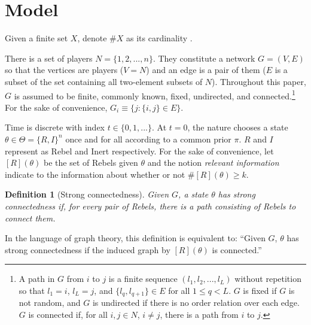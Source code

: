 \documentclass[12pt,letter]{article}
\newtheorem{definition}{Definition}[section]
\theoremstyle{definition}
\theoremstyle{remark}
\theoremstyle{claim}
\begin{document}
\section{Model}
\label{sec:model}
Given a finite set $X$, denote $\#X$ as its cardinality . 


There is a set of players $N=\{1,2,...,n\}$. They constitute a network $G=(V,E)$ so that the vertices are players ($V=N$) and an edge is a pair of them ($E$ is a subset of the set containing all two-element subsets of $N$). Throughout this paper, $G$ is assumed to be finite, commonly known, fixed, undirected, and connected.\footnote{A path in $G$ from $i$ to $j$ is a finite sequence $(l_1,l_2,...,l_L)$ without repetition so that $l_1=i$, $l_L=j$, and $\{l_q,l_{q+1}\}\in E$ for all $1\leq q<L$. $G$ is fixed if $G$ is not random, and $G$ is undirected if there is no order relation over each edge. $G$ is connected if, for all $i,j\in N$, $i\neq j$, there is a path from $i$ to $j$.}
For the sake of convenience, $G_i\equiv \{j:\{i,j\}\in E\}$.

Time is discrete with index $t\in\{0,1,...\}$. At $t=0$, the nature chooses a state $\theta\in \Theta=\{R,I\}^n$ once and for all according to a common prior $\pi$. $R$ and $I$ represent as Rebel and Inert respectively. For the sake of convenience, let $[R](\theta)$ be the set of Rebels given $\theta$ and the notion \textit{relevant information} indicate to the information about whether or not $\#[R](\theta)\geq k$.



\begin{definition}[Strong connectedness]
Given $G$, a state $\theta$ has strong connectedness if, for every pair of Rebels, there is a path consisting of Rebels to connect them.

\end{definition}  

In the language of graph theory, this definition is equivalent to: ``Given $G$, $\theta$ has strong connectedness if the induced graph by $[R](\theta)$ is connected.''
\end{document}
